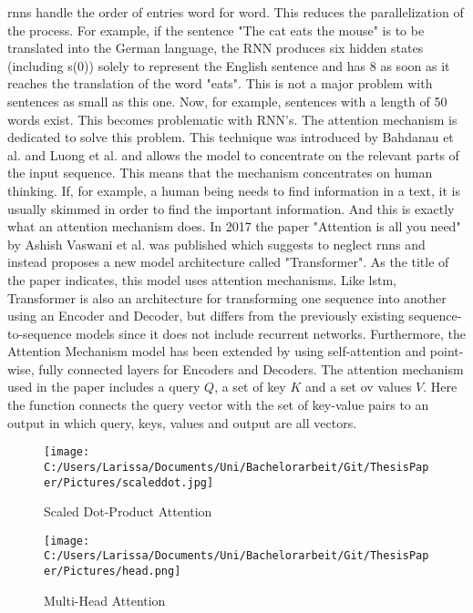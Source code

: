 \documentclass[a4paper, 11pt,titlepage,oneside,openany]{book}
\begin{document}
\noindent \gls{rnn}s handle the order of entries word for word. This reduces the parallelization of the process. For example, if the sentence "The cat eats the mouse" is to be translated into the German language, the RNN produces six hidden states (including s(0)) solely to represent the English sentence and has 8 as soon as it reaches the translation of the word "eats". This is not a major problem with sentences as small as this one. Now, for example, sentences with a length of 50 words exist. This becomes problematic with RNN's. The attention mechanism is dedicated to solve this problem. This technique was introduced by Bahdanau et al. \cite{bahdnau} and Luong et al. \cite{lunong} and allows the model to concentrate on the relevant parts of the input sequence. This means that the mechanism concentrates on human thinking. If, for example, a human being needs to find information in a text, it is usually skimmed in order to find the important information. And this is exactly what an attention mechanism does. 
\newpage
In 2017 the paper "Attention is all you need" by Ashish Vaswani et al.  \cite{attention} was published which suggests to neglect \gls{rnn}s and instead proposes a new model architecture called "Transformer". As the title of the paper indicates, this model uses attention mechanisms. Like \gls{lstm}, Transformer is also an architecture for transforming one sequence into another using an Encoder and Decoder, but differs from the previously existing sequence-to-sequence models since it does not include recurrent networks. Furthermore, the Attention Mechanism model has been extended by using self-attention and point-wise, fully connected layers for Encoders and Decoders.
The attention mechanism used in the paper includes a query $Q$, a set of key $K$ and a set ov values $V$. Here the function connects the query vector with the set of key-value pairs to an output in which query, keys, values and output are all vectors.\\
\begin{figure}[t]
	\begin{minipage}[b]{0.5\linewidth}
		\texttt{[image: C:/Users/Larissa/Documents/Uni/Bachelorarbeit/Git/ThesisPaper/Pictures/scaleddot.jpg]}
		\caption{Scaled Dot-Product Attention}
	\end{minipage}
	\hfill
	\begin{minipage}[b]{0.5\linewidth}
		\texttt{[image: C:/Users/Larissa/Documents/Uni/Bachelorarbeit/Git/ThesisPaper/Pictures/head.png]}
		\caption{Multi-Head Attention}
	\end{minipage}
\end{figure}
\end{document}
